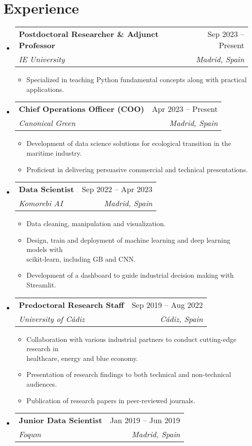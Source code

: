 \documentclass[a4paper,11pt]{article}
\makeatletter
\newcommand{\resumeItem}[1]{
	\item\small{#1}
}
\newcommand{\resumeItemListStart}{\begin{itemize}[rightmargin=0.11in]}
\newcommand{\resumeItemListEnd}{\end{itemize}}
\newcommand{\resumeQuadHeading}[4]{
	\item
	\begin{tabular*}{0.96\textwidth}[t]{l@{\extracolsep{\fill}}r}
		\textbf{#1} & #2 \\
		\textit{\small#3} & \textit{\small #4} \\
	\end{tabular*}
}
\newcommand{\resumeHeadingListStart}{
	\begin{itemize}[leftmargin=0.15in, label={}]
	}
\newcommand{\resumeHeadingListEnd}{\end{itemize}}
\makeatother
\begin{document}
	
	
	\section{Experience}
	\resumeHeadingListStart{}
	
	\resumeQuadHeading{Postdoctoral Researcher \& Adjunct Professor}{Sep 2023 -- Present}
	{IE University}{Madrid, Spain}
	\resumeItemListStart{}
	\resumeItem{Specialized in teaching Python fundamental concepts along with practical applications.}
	\resumeItemListEnd{}
	
	\resumeQuadHeading{Chief Operations Officer (COO)}{Apr 2023 -- Present}
	{Canonical Green}{Madrid, Spain}
	\resumeItemListStart{}
	\resumeItem{Development of data science solutions for ecological transition in the maritime industry.}
	\resumeItem{Proficient in delivering persuasive commercial and technical presentations.}
	\resumeItemListEnd{}
	
	\resumeQuadHeading{Data Scientist}{Sep 2022 -- Apr 2023}
	{Komorebi AI}{Madrid, Spain}
	\resumeItemListStart{}
	\resumeItem{Data cleaning, manipulation and visualization.}
	\resumeItem{Design, train and deployment of machine learning and deep learning models with\\scikit-learn, including GB and CNN.}
	\resumeItem{Development of a dashboard to guide industrial decision making with Streamlit.}
	\resumeItemListEnd{}
	
	\resumeQuadHeading{Predoctoral Research Staff}{Sep 2019 -- Aug 2022}
	{University of C\'adiz}{C\'adiz, Spain}
	\resumeItemListStart{}
	\resumeItem{Collaboration with various industrial partners to conduct cutting-edge research in\\healthcare, energy and blue economy.}
	\resumeItem{Presentation of research findings to both technical and non-technical audiences.}
	\resumeItem{Publication of research papers in peer-reviewed journals.}
	\resumeItemListEnd{}
	
	\resumeQuadHeading{Junior Data Scientist}{Jan 2019 -- Jun 2019}{Foqum}{Madrid, Spain}
	
	\resumeHeadingListEnd{}
	
\end{document}
